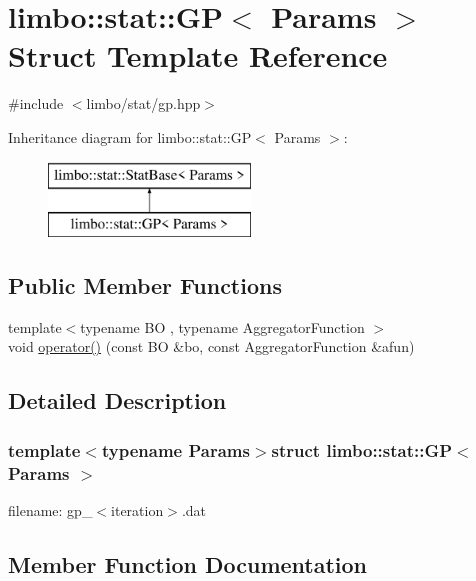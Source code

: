 \hypertarget{structlimbo_1_1stat_1_1_g_p}{}\section{limbo\+:\+:stat\+:\+:G\+P$<$ Params $>$ Struct Template Reference}
\label{structlimbo_1_1stat_1_1_g_p}


{\ttfamily \#include $<$limbo/stat/gp.\+hpp$>$}

Inheritance diagram for limbo\+:\+:stat\+:\+:G\+P$<$ Params $>$\+:\begin{figure}[H]
\begin{center}
\leavevmode
\includegraphics[height=2.000000cm]{structlimbo_1_1stat_1_1_g_p}
\end{center}
\end{figure}
\subsection*{Public Member Functions}
\begin{DoxyCompactItemize}
\item 
{\footnotesize template$<$typename B\+O , typename Aggregator\+Function $>$ }\\void \hyperlink{structlimbo_1_1stat_1_1_g_p_ae1af2dda46c2aaca5f757871b038694e}{operator()} (const B\+O \&bo, const Aggregator\+Function \&afun)
\end{DoxyCompactItemize}


\subsection{Detailed Description}
\subsubsection*{template$<$typename Params$>$struct limbo\+::stat\+::\+G\+P$<$ Params $>$}

filename\+: {\ttfamily gp\+\_\+$<$iteration$>$.dat} 

\subsection{Member Function Documentation}
\hypertarget{structlimbo_1_1stat_1_1_g_p_ae1af2dda46c2aaca5f757871b038694e}{}
